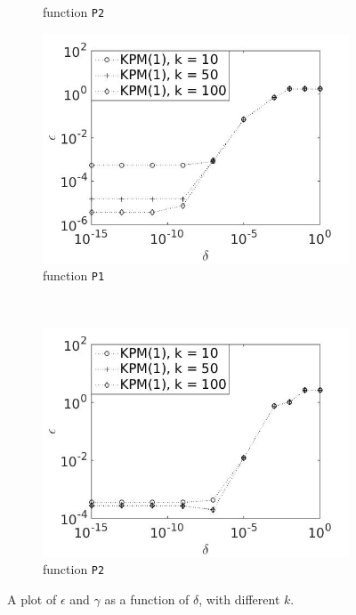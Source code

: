 \begin{figure}[H]
\begin{subfigure}[b]{0.45\textwidth}
                \caption{ function \texttt{P2}}
                \label{fig:anttol2k}
        \end{subfigure}
                \begin{subfigure}[b]{0.45\textwidth}
                \includegraphics[width=\textwidth]{fig/s22errvstol1k}
                \caption{function \texttt{P1}}
                \label{fig:errtol1k}
        \end{subfigure}
~
        \begin{subfigure}[b]{0.45\textwidth}
                \includegraphics[width=\textwidth]{fig/s23errvstol2k}
                \caption{ function \texttt{P2}}
                \label{fig:errtol2k}
        \end{subfigure}
        \caption{A plot of $\epsilon$ and $\gamma$ as a function of $\delta$, with different $k$.} \label{fig:errtolk}
\end{figure}

\newpage